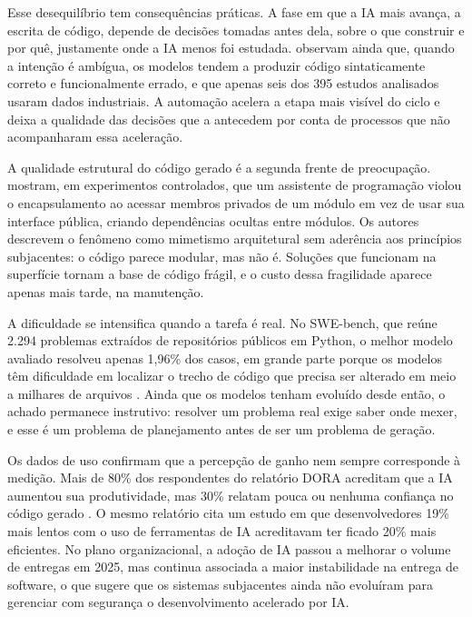 Esse desequilíbrio tem consequências práticas. A fase em que a IA mais avança, a escrita de código, depende de decisões tomadas antes dela, sobre o que construir e por quê, justamente onde a IA menos foi estudada.  observam ainda que, quando a intenção é ambígua, os modelos tendem a produzir código sintaticamente correto e funcionalmente errado, e que apenas seis dos 395 estudos analisados usaram dados industriais. A automação acelera a etapa mais visível do ciclo e deixa a qualidade das decisões que a antecedem por conta de processos que não acompanharam essa aceleração.

A qualidade estrutural do código gerado é a segunda frente de preocupação.  mostram, em experimentos controlados, que um assistente de programação violou o encapsulamento ao acessar membros privados de um módulo em vez de usar sua interface pública, criando dependências ocultas entre módulos. Os autores descrevem o fenômeno como mimetismo arquitetural sem aderência aos princípios subjacentes: o código parece modular, mas não é. Soluções que funcionam na superfície tornam a base de código frágil, e o custo dessa fragilidade aparece apenas mais tarde, na manutenção.

A dificuldade se intensifica quando a tarefa é real. No SWE-bench, que reúne 2.294 problemas extraídos de repositórios públicos em Python, o melhor modelo avaliado resolveu apenas 1,96\% dos casos, em grande parte porque os modelos têm dificuldade em localizar o trecho de código que precisa ser alterado em meio a milhares de arquivos \cite{jimenez2024swebench}. Ainda que os modelos tenham evoluído desde então, o achado permanece instrutivo: resolver um problema real exige saber onde mexer, e esse é um problema de planejamento antes de ser um problema de geração.

Os dados de uso confirmam que a percepção de ganho nem sempre corresponde à medição. Mais de 80\% dos respondentes do relatório DORA acreditam que a IA aumentou sua produtividade, mas 30\% relatam pouca ou nenhuma confiança no código gerado \cite{dora2025}. O mesmo relatório cita um estudo em que desenvolvedores 19\% mais lentos com o uso de ferramentas de IA acreditavam ter ficado 20\% mais eficientes. No plano organizacional, a adoção de IA passou a melhorar o volume de entregas em 2025, mas continua associada a maior instabilidade na entrega de software, o que sugere que os sistemas subjacentes ainda não evoluíram para gerenciar com segurança o desenvolvimento acelerado por IA.

